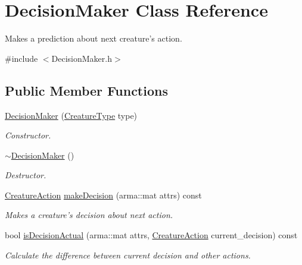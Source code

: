 \hypertarget{classDecisionMaker}{\section{Decision\-Maker Class Reference}
\label{classDecisionMaker}
}


Makes a prediction about next creature's action.  




{\ttfamily \#include $<$Decision\-Maker.\-h$>$}

\subsection*{Public Member Functions}
\begin{DoxyCompactItemize}
\item 
\hyperlink{classDecisionMaker_a85c907bce0904c520e748ec9d1047e0c}{Decision\-Maker} (\hyperlink{BasicTypes_8h_a5bc40f1116d89138cda8ebd1a04694df}{Creature\-Type} type)
\begin{DoxyCompactList}\small\item\em Constructor. \end{DoxyCompactList}\item 
\hyperlink{classDecisionMaker_a0cc27a5a77631e71aece59ee279ef7b3}{$\sim$\-Decision\-Maker} ()
\begin{DoxyCompactList}\small\item\em Destructor. \end{DoxyCompactList}\item 
\hyperlink{BasicTypes_8h_a5303344c79577371e13252b373606706}{Creature\-Action} \hyperlink{classDecisionMaker_a2ff03b6b1b4efe9e559dd5078e96054c}{make\-Decision} (arma\-::mat attrs) const 
\begin{DoxyCompactList}\small\item\em Makes a creature's decision about next action. \end{DoxyCompactList}\item 
bool \hyperlink{classDecisionMaker_ad2b20e2847961ff6d1193d15178dd14c}{is\-Decision\-Actual} (arma\-::mat attrs, \hyperlink{BasicTypes_8h_a5303344c79577371e13252b373606706}{Creature\-Action} current\-\_\-decision) const 
\begin{DoxyCompactList}\small\item\em Calculate the difference between current decision and other actions. \end{DoxyCompactList}\end{DoxyCompactItemize}


